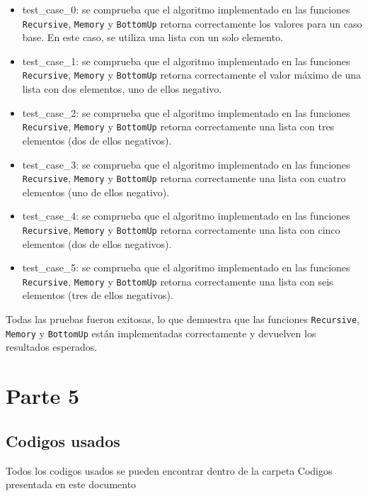 \documentclass[11pt]{article}
\makeatletter
\newcommand{\boxspacing}{\kern\kvtcb@left@rule\kern\kvtcb@boxsep}
\newcommand{\prompt}[4]{
        {\ttfamily\llap{{\color{#2}[#3]:\hspace{3pt}#4}}\vspace{-\baselineskip}}
    }
\makeatother
\begin{document}
\begin{itemize}
\item
  test\_case\_0: se comprueba que el algoritmo implementado en las
  funciones \texttt{Recursive}, \texttt{Memory} y \texttt{BottomUp}
  retorna correctamente los valores para un caso base. En este caso, se
  utiliza una lista con un solo elemento.
\item
  test\_case\_1: se comprueba que el algoritmo implementado en las
  funciones \texttt{Recursive}, \texttt{Memory} y \texttt{BottomUp}
  retorna correctamente el valor máximo de una lista con dos elementos,
  uno de ellos negativo.
\item
  test\_case\_2: se comprueba que el algoritmo implementado en las
  funciones \texttt{Recursive}, \texttt{Memory} y \texttt{BottomUp}
  retorna correctamente una lista con tres elementos (dos de ellos
  negativos).
\item
  test\_case\_3: se comprueba que el algoritmo implementado en las
  funciones \texttt{Recursive}, \texttt{Memory} y \texttt{BottomUp}
  retorna correctamente una lista con cuatro elementos (uno de ellos
  negativo).
\item
  test\_case\_4: se comprueba que el algoritmo implementado en las
  funciones \texttt{Recursive}, \texttt{Memory} y \texttt{BottomUp}
  retorna correctamente una lista con cinco elementos (dos de ellos
  negativos).
\item
  test\_case\_5: se comprueba que el algoritmo implementado en las
  funciones \texttt{Recursive}, \texttt{Memory} y \texttt{BottomUp}
  retorna correctamente una lista con seis elementos (tres de ellos
  negativos).
\end{itemize}

Todas las pruebas fueron exitosas, lo que demuestra que las funciones
\texttt{Recursive}, \texttt{Memory} y \texttt{BottomUp} están
implementadas correctamente y devuelven los resultados esperados.

\hypertarget{parte-5}{%
\section{Parte 5}\label{parte-5}}
\pagebreak
\hypertarget{codigos-usados}{%
\subsection{Codigos usados}\label{codigos-usados}}

Todos los codigos usados se pueden encontrar dentro de la carpeta
Codigos presentada en este documento

    \begin{tcolorbox}[breakable, size=fbox, boxrule=1pt, pad at break*=1mm,colback=cellbackground, colframe=cellborder]
\prompt{In}{incolor}{ }{\boxspacing}
\begin{Verbatim}[commandchars=\\\{\}]

\end{Verbatim}
\end{tcolorbox}
\end{document}
